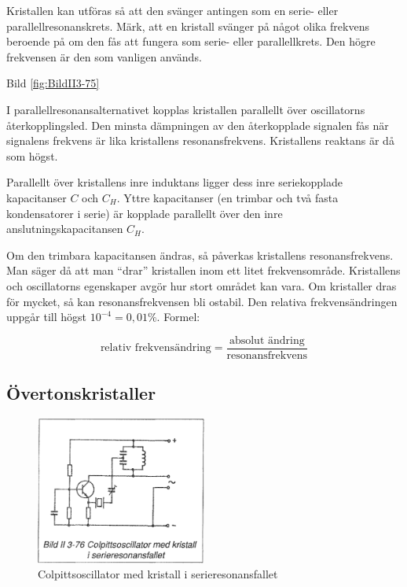 Kristallen kan utföras så att den svänger antingen som en serie- eller
parallellresonanskrets. Märk, att en kristall svänger på något olika
frekvens beroende på om den fås att fungera som serie- eller
parallellkrets.  Den högre frekvensen är den som vanligen används.

Bild \ref{fig:BildII3-75}

I parallellresonansalternativet kopplas kristallen parallellt över
oscillatorns återkopplingsled. Den minsta dämpningen av den
återkopplade signalen fås när signalens frekvens är lika kristallens
resonansfrekvens.  Kristallens reaktans är då som högst.

Parallellt över kristallens inre induktans ligger dess inre
seriekopplade kapacitanser \(C\) och \(C_H\). Yttre kapacitanser (en
trimbar och två fasta kondensatorer i serie) är kopplade parallellt
över den inre anslutningskapacitansen \(C_H\).

Om den trimbara kapacitansen ändras, så påverkas kristallens
resonansfrekvens.  Man säger då att man ``drar'' kristallen inom ett
litet frekvensområde. Kristallens och oscillatorns egenskaper avgör
hur stort området kan vara. Om kristaller dras för mycket, så kan
resonansfrekvensen bli ostabil.  Den relativa frekvensändringen uppgår
till högst \(10^{-4} = 0,01\%\). Formel:

\[
\text{relativ frekvensändring} =
\frac{\text{absolut ändring}}{\text{resonansfrekvens}}
\]

\subsection{Övertonskristaller}

\begin{figure}
\includegraphics[width=0.5\textwidth]{images/bild_2_3-76}
\caption{Colpittsoscillator med kristall i serieresonansfallet}
\label{fig:BildII3-76}
\end{figure}

